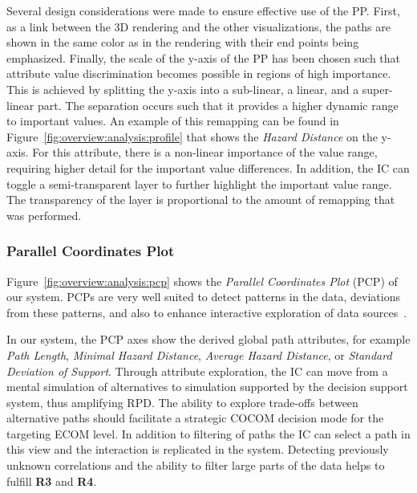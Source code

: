 \documentclass{egpubl}
\begin{document}
Several design considerations were made to ensure effective use of the PP. First, as a link between the 3D rendering and the other visualizations, the paths are shown in the same color as in the rendering with their end points being emphasized. Finally, the scale of the y-axis of the PP has been chosen such that attribute value discrimination becomes possible in regions of high importance. This is achieved by splitting the y-axis into a sub-linear, a linear, and a super-linear part. The separation occurs such that it provides a higher dynamic range to important values. An example of this remapping can be found in Figure~\ref{fig:overview:analysis:profile} that shows the \emph{Hazard Distance} on the y-axis. For this attribute, there is a non-linear importance of the value range, requiring higher detail for the important value differences. In addition, the IC can toggle a semi-transparent layer to further highlight the important value range. The transparency of the layer is proportional to the amount of remapping that was performed.

\subsubsection{Parallel Coordinates Plot} \label{sec:overview:analysis:pcp}
Figure~\ref{fig:overview:analysis:pcp} shows the \emph{Parallel Coordinates Plot} (PCP) of our system. PCPs are very well suited to detect patterns in the data, deviations from these patterns, and also to enhance interactive exploration of data sources~\cite{Tory05aparallel}.

In our system, the PCP axes show the derived global path attributes, for example \emph{Path Length}, \emph{Minimal Hazard Distance}, \emph{Average Hazard Distance}, or \emph{Standard Deviation of Support}. Through attribute exploration, the IC can move from a mental simulation of alternatives to simulation supported by the decision support system, thus amplifying RPD. The ability to explore trade-offs between alternative paths should facilitate a strategic COCOM decision mode for the targeting ECOM level. In addition to filtering of paths the IC can select a path in this view and the interaction is replicated in the system. Detecting previously unknown correlations and the ability to filter large parts of the data helps to fulfill {\bfseries R3} and {\bfseries R4}.
\end{document}
